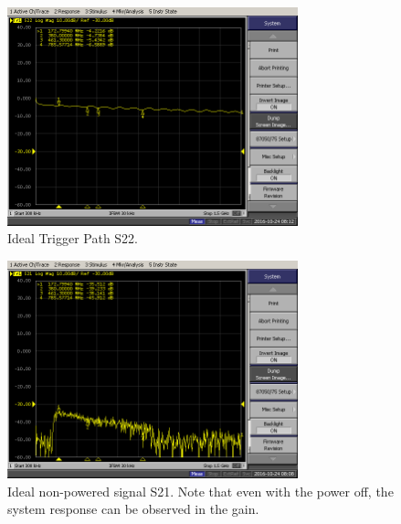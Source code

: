 \documentclass[letter,12pt]{article}
\begin{document}
\begin{figure}
\begin{centering}
\includegraphics[width=0.75\textwidth]{photos/IDEAL-S22-TRIG.PNG}
\par\end{centering}
\caption{Ideal Trigger Path S22.}
\label{ideal-trig-s22}
\end{figure}

\begin{figure}
\begin{centering}
\includegraphics[width=0.75\textwidth]{photos/IDEAL-S21-SIG-NOPOWER.PNG}
\par\end{centering}
\caption{Ideal non-powered signal S21. Note that even with the power off, the
system response can be observed in the gain.}
\label{ideal-sig-s21-nopwr}
\end{figure}
\end{document}
